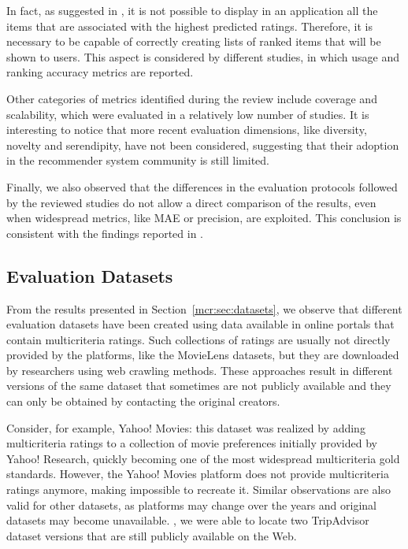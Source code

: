 In fact, as suggested in \cite{Herlocker2000}, it is not possible to display in an application all the items that are associated with the highest predicted ratings. Therefore, it is necessary to be capable of correctly creating lists of ranked items that will be shown to users. This aspect is considered by different studies, in which usage and ranking accuracy metrics are reported.

Other categories of metrics identified during the review include coverage and scalability, which were evaluated in a relatively low number of studies. It is interesting to notice that more recent evaluation dimensions, like diversity, novelty and serendipity, have not been considered, suggesting that their adoption in the recommender system community is still limited.

Finally, we also observed that the differences in the evaluation protocols followed by the reviewed studies do not allow a direct comparison of the results, even when widespread metrics, like MAE or precision, are exploited.  This conclusion is consistent with the findings reported in \cite{Said2014}.

\subsection{Evaluation Datasets}

From the results presented in Section~\ref{mcr:sec:datasets}, we observe that different evaluation datasets have been created using data available in online portals that contain multicriteria ratings. Such collections of ratings are usually not directly provided by the platforms, like the MovieLens datasets, but they are downloaded by researchers using web crawling methods. These approaches result in different versions of the same dataset that sometimes are not publicly available and they can only be obtained by contacting the original creators.

Consider, for example, Yahoo! Movies: this dataset was realized by adding multicriteria ratings to a collection of movie preferences initially provided by Yahoo! Research, quickly becoming one of the most widespread multicriteria gold standards. However, the Yahoo! Movies platform does not provide multicriteria ratings anymore, making impossible to recreate it. Similar observations are also valid for other datasets, as platforms may change over the years and original datasets may become unavailable. , we were able to locate two TripAdvisor dataset versions that are still publicly available on the Web.

